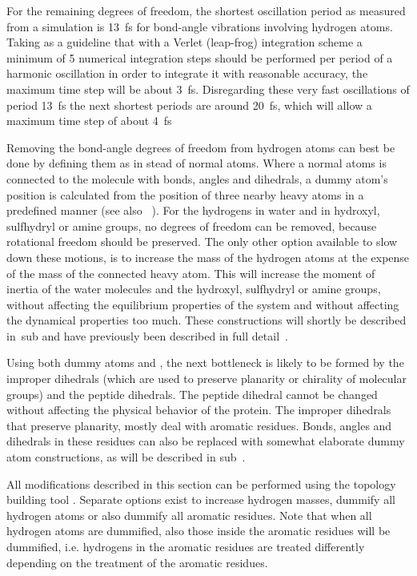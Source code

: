 For the remaining degrees of freedom, the shortest oscillation period
as measured from a simulation is 13~fs for bond-angle vibrations
involving hydrogen atoms. Taking as a guideline that with a Verlet
(leap-frog) integration scheme a minimum of 5 numerical integration
steps should be performed per period of a harmonic oscillation in
order to integrate it with reasonable accuracy, the maximum time step
will be about 3~fs. Disregarding these very fast oscillations of
period 13~fs the next shortest periods are around 20~fs, which will
allow a maximum time step of about 4~fs

Removing the bond-angle degrees of freedom from hydrogen atoms can
best be done by defining them as  in stead of
normal atoms. Where a normal atoms is connected to the molecule with
bonds, angles and dihedrals, a dummy atom's position is calculated
from the position of three nearby heavy atoms in a predefined manner
(see also ~). For the hydrogens in water and in
hydroxyl, sulfhydryl or amine groups, no degrees of freedom can be
removed, because rotational freedom should be preserved. The only
other option available to slow down these motions, is to increase the
mass of the hydrogen atoms at the expense of the mass of the connected
heavy atom. This will increase the moment of inertia of the water
molecules and the hydroxyl, sulfhydryl or amine groups, without
affecting the equilibrium properties of the system and without
affecting the dynamical properties too much. These constructions will
shortly be described in~sub and have previously
been described in full detail~\cite{feenstra99}.

Using both dummy atoms and , the next
bottleneck is likely to be formed by the improper dihedrals (which are
used to preserve planarity or chirality of molecular groups) and the
peptide dihedrals. The peptide dihedral cannot be changed without
affecting the physical behavior of the protein. The improper dihedrals
that preserve planarity, mostly deal with aromatic residues. Bonds,
angles and dihedrals in these residues can also be replaced with
somewhat elaborate dummy atom constructions, as will be described in
sub~.

All modifications described in this section can be performed using the
{\gromacs} topology building tool {\tt {}}. Separate
options exist to increase hydrogen masses, dummify all hydrogen atoms
or also dummify all aromatic residues. Note that when all hydrogen
atoms are dummified, also those inside the aromatic residues will be
dummified, i.e. hydrogens in the aromatic residues are treated
differently depending on the treatment of the aromatic residues.

